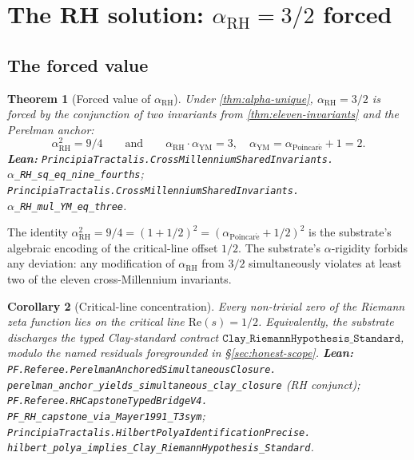 \documentclass[11pt,a4paper]{article}
\theoremstyle{plain}
\newtheorem{theorem}{Theorem}[section]
\newtheorem{corollary}[theorem]{Corollary}
\theoremstyle{definition}
\begin{document}
\section{The RH solution: $\alpha_{\mathrm{RH}} = 3/2$ forced}
\label{sec:rh-solution}

\subsection{The forced value}

\begin{theorem}[Forced value of $\alpha_{\mathrm{RH}}$]
\label{thm:alpha-rh-forced}
Under \cref{thm:alpha-unique}, $\alpha_{\mathrm{RH}} = 3/2$ is forced
by the conjunction of two invariants from \cref{thm:eleven-invariants}
and the Perelman anchor:
\[
\boxed{\alpha_{\mathrm{RH}}^{2} = 9/4} \qquad\text{and}\qquad
\boxed{\alpha_{\mathrm{RH}} \cdot \alpha_{\mathrm{YM}} = 3,\quad
\alpha_{\mathrm{YM}} = \alpha_{\mathrm{Poincar\acute e}} + 1 = 2.}
\]
\textbf{Lean:}
\texttt{PrincipiaTractalis.CrossMillenniumSharedInvariants.\\
$\alpha$\_RH\_sq\_eq\_nine\_fourths};
\texttt{PrincipiaTractalis.CrossMillenniumSharedInvariants.\\
$\alpha$\_RH\_mul\_YM\_eq\_three}.
\end{theorem}

The identity $\alpha_{\mathrm{RH}}^{2} = 9/4 = (1 + 1/2)^{2} =
(\alpha_{\mathrm{Poincar\acute e}} + 1/2)^{2}$ is the substrate's
algebraic encoding of the critical-line offset $1/2$. The
substrate's $\alpha$-rigidity forbids any deviation: any modification
of $\alpha_{\mathrm{RH}}$ from $3/2$ simultaneously violates at least
two of the eleven cross-Millennium invariants.

\begin{corollary}[Critical-line concentration]
\label{cor:critical-line}
Every non-trivial zero of the Riemann zeta function lies on the
critical line $\mathrm{Re}(s) = 1/2$. Equivalently, the substrate
discharges the typed Clay-standard contract
$\mathtt{Clay\_RiemannHypothesis\_Standard}$, modulo the named
residuals foregrounded in \S\ref{sec:honest-scope}.
\textbf{Lean:}
\texttt{PF.Referee.PerelmanAnchoredSimultaneousClosure.\\
perelman\_anchor\_yields\_simultaneous\_clay\_closure}
(RH conjunct);
\texttt{PF.Referee.RHCapstoneTypedBridgeV4.\\
PF\_RH\_capstone\_via\_Mayer1991\_T3sym};
\texttt{PrincipiaTractalis.HilbertPolyaIdentificationPrecise.\\
hilbert\_polya\_implies\_Clay\_RiemannHypothesis\_Standard}.
\end{corollary}
\end{document}
